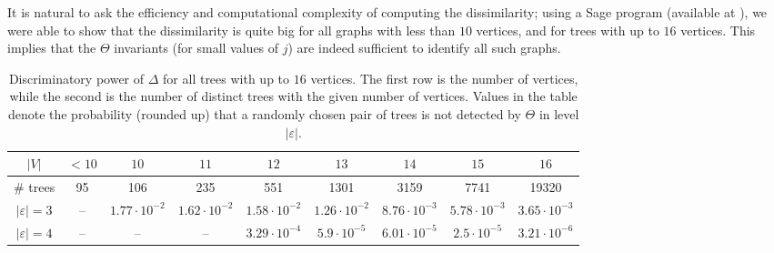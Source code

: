 \documentclass[11pt, a4paper, reqno, twoside, makeidx]{amsart}
\theoremstyle{remark}
\theoremstyle{plain}
\theoremstyle{definition}
\newcommand{\perc}[2]{#1 \cdot 10^{-#2}}
\begin{document}
It is natural to ask the efficiency and computational complexity of computing the dissimilarity; using a Sage program (available at \cite{miogithub}), we were able to show that the dissimilarity is quite big for all graphs with less than $10$ vertices, and for trees with up to $16$ vertices. This implies that the $\Theta$ invariants (for small values of $j$) are indeed sufficient to identify all such graphs. 

\begin{table}[ht]
\begin{center}
\begin{tabular}{|c|c|c|c|c|c|c|c|c|}
\hline
$|V|$ & $<10$ & $10$ & $11$ & $12$ & $13$ & $14$ & $15$ &$16$\\
\hline
\# trees & 95 & 106 & 235 & 551 & 1301 & 3159 & 7741 & 19320  \\
\hline
\hline
$|\varepsilon| = 3$ & -- & $ \perc{1.77}{2}$ & $\perc{1.62}{2}$ & $\perc{1.58}{2}$ &  $\perc{1.26}{2}$ &  $\perc{8.76}{3}$ &  $\perc{5.78}{3}$ &  $\perc{3.65}{3} $\\
\hline
$|\varepsilon| = 4$ & -- & -- & -- & $\perc{3.29}{4}$ & $ \perc{5.9}{5}$ &  $\perc{6.01}{5}$ & $ \perc{2.5}{5}$ &    $\perc{3.21}{6}$\\
\hline
\end{tabular}
\vspace{0.3cm}
\caption{Discriminatory power of $\Delta$ for all trees with up to $16$ vertices. The first row is the number of vertices, while the second is the number of distinct trees with the given number of vertices.
Values in the table denote the probability (rounded up) that a randomly chosen pair of trees is not detected by $\Theta$ in level $|\varepsilon|$. 
}
\label{tab:datatrees}
\end{center}
\end{table}
\end{document}
